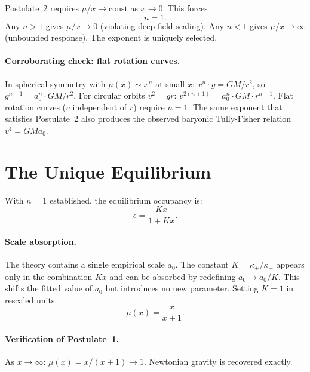 \documentclass[twocolumn]{iopjournal}
\begin{document}
Postulate~2 requires $\mu/x \to \text{const}$ as $x \to 0$.
This forces
\begin{equation}
  n = 1.
  \label{eq:n_equals_1}
\end{equation}
Any $n > 1$ gives $\mu/x \to 0$ (violating deep-field scaling).
Any $n < 1$ gives $\mu/x \to \infty$ (unbounded response). The
exponent is uniquely selected.

\paragraph{Corroborating check: flat rotation curves.}
In spherical symmetry with $\mu(x) \sim x^n$ at small $x$:
$x^n \cdot g = GM/r^2$, so $g^{n+1} = a_0^n \cdot GM/r^2$.
For circular orbits $v^2 = gr$:
$v^{2(n+1)} = a_0^n \cdot GM \cdot r^{n-1}$.
Flat rotation curves ($v$ independent of $r$) require $n = 1$.
The same exponent that satisfies Postulate~2 also produces the
observed baryonic Tully-Fisher relation $v^4 = GMa_0$.


\section*{The Unique Equilibrium}

With $n = 1$ established, the equilibrium occupancy is:
\begin{equation}
  \epsilon = \frac{K x}{1 + K x}.
  \label{eq:epsilon}
\end{equation}

\paragraph{Scale absorption.}
The theory contains a single empirical scale $a_0$. The constant
$K = \kappa_+/\kappa_-$ appears only in the combination $Kx$
and can be absorbed by redefining $a_0 \to a_0/K$. This shifts
the fitted value of $a_0$ but introduces no new parameter.
Setting $K = 1$ in rescaled units:
\begin{equation}
  \boxed{\mu(x) = \frac{x}{x + 1}.}
  \label{eq:constitutive}
\end{equation}

\paragraph{Verification of Postulate~1.}
As $x \to \infty$: $\mu(x) = x/(x+1) \to 1$. Newtonian gravity
is recovered exactly.
\end{document}
